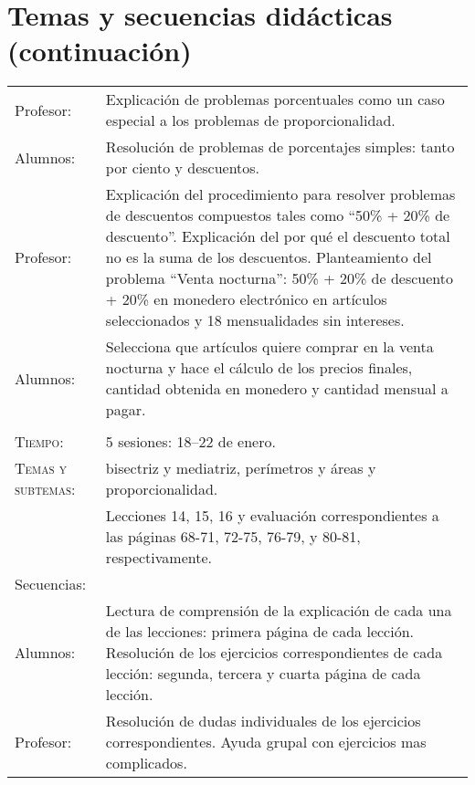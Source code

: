 \documentclass[letterpaper,10pt]{article}
\begin{document}
\section{Temas  y secuencias did\'acticas (continuaci\'on)}

\vfill

\begin{tabular}[t]{R{0.25\textwidth}p{0.71\textwidth}}
    

    Profesor:   & Explicaci\'on de problemas porcentuales como un caso especial
    a los problemas de proporcionalidad. \\    

    Alumnos:     & Resoluci\'on de problemas de porcentajes simples: tanto por
    ciento y descuentos. \\    

    Profesor:   & Explicaci\'on del procedimiento para resolver problemas de
    descuentos compuestos tales como ``50\% + 20\% de descuento''. Explicaci\'on
    del por qu\'e el descuento total no es la suma de los descuentos.
    Planteamiento del problema ``Venta nocturna'': 50\% + 20\% de descuento +
    20\% en monedero electr\'onico en art\'iculos seleccionados y 18
    mensualidades sin intereses. \\ 

    Alumnos:     & Selecciona que art\'iculos quiere comprar en la venta
    nocturna y hace el c\'alculo de los precios finales, cantidad obtenida en
    monedero y cantidad mensual a pagar.
\\ \hline \\
    \textsc{Tiempo:}           & 5 sesiones: 18--22  de enero. \\
    \textsc{Temas y subtemas:} & bisectriz y mediatriz, per\'imetros y \'areas
    y proporcionalidad.\\
     & Lecciones 14, 15, 16 y evaluaci\'on 
    correspondientes a las p\'aginas 68-71, 72-75, 76-79, y 80-81, 
    respectivamente.\\ 
    \large{\sc Secuencias:} \\

    Alumnos:    & Lectura de comprensi\'on de la explicaci\'on de cada una de
    las lecciones: primera p\'agina de cada lecci\'on. Resoluci\'on de los
    ejercicios correspondientes de cada lecci\'on: segunda, tercera y cuarta
    p\'agina de cada lecci\'on.  \\

    Profesor:   & Resoluci\'on de dudas individuales de los ejercicios
    correspondientes. Ayuda grupal con ejercicios mas complicados. \\


\end{tabular}
\end{document}
